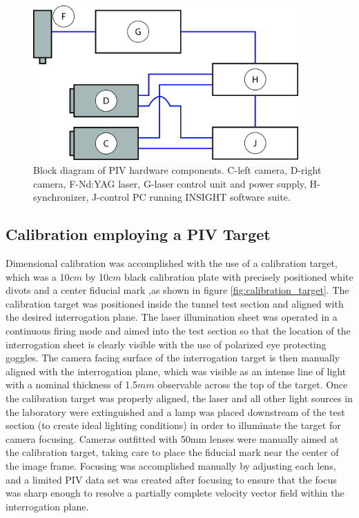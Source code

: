 \begin{figure}[H]
	\centering
	\includegraphics[width=4in]{figs/piv_method/experiment_block_diagram}
	\caption{Block diagram of PIV hardware components. C-left camera, D-right 
		camera, F-Nd:YAG laser, G-laser control unit and power supply, 
		H-synchronizer, 
		J-control PC running INSIGHT software suite.}
	\label{fig:pivblockdiagram}
\end{figure}

\subsection{Calibration employing a PIV Target}

Dimensional calibration was accomplished with the use of a calibration target, 
which was a 10$cm$ by 10$cm$ black calibration plate with precisely positioned 
white divots and a center fiducial mark ,as shown in figure 
\ref{fig:calibration_target}. The calibration target was positioned inside the 
tunnel test section and aligned with the desired interrogation plane. 
The laser illumination sheet was operated in a continuous firing mode and aimed 
into the test section so that the location of the interrogation sheet is 
clearly visible with the use of polarized eye protecting goggles. The camera 
facing surface of the 
interrogation target is then manually aligned with the interrogation plane, 
which was visible as an intense line of light with a nominal thickness of 
1.5$mm$ observable across the top of the target. Once the calibration target 
was properly aligned, the laser and all other light sources in the laboratory 
were extinguished and a lamp was placed downstream of the test section (to 
create ideal lighting conditions) in order to illuminate the target for camera 
focusing. Cameras outfitted with 50mm lenses were manually aimed at the 
calibration target, taking care to place the fiducial mark near the center of 
the image frame. Focusing was accomplished manually by adjusting each lens, and 
a limited PIV data set was created after focusing to ensure that the focus was 
sharp enough to resolve a partially complete velocity vector field within the 
interrogation plane.

